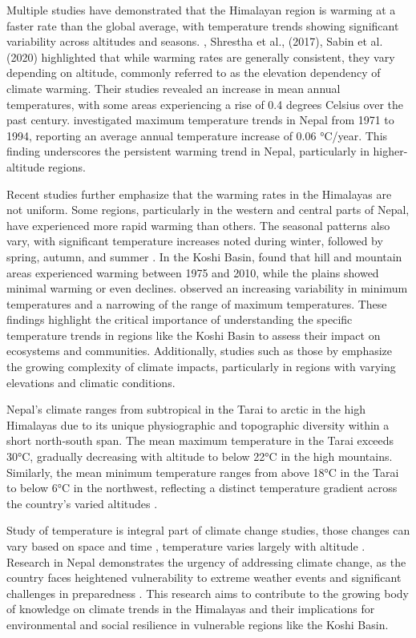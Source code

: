 Multiple studies have demonstrated that the Himalayan region is warming at a faster rate than the global average, with temperature trends showing significant variability across altitudes and seasons. \citet{hingane_longterm_1985,shrestha_observed_2017,Sabin2020} , Shrestha et al., (2017), Sabin et al. (2020) highlighted that while warming rates are generally consistent, they vary depending on altitude, commonly referred to as the elevation dependency of climate warming. Their studies revealed an increase in mean annual temperatures, with some areas experiencing a rise of 0.4 degrees Celsius over the past century. \citet{shrestha_maximum_1999} investigated maximum temperature trends in Nepal from 1971 to 1994, reporting an average annual temperature increase of 0.06 °C/year. This finding underscores the persistent warming trend in Nepal, particularly in higher-altitude regions.


Recent studies further emphasize that the warming rates in the Himalayas are not uniform. Some regions, particularly in the western and central parts of Nepal, have experienced more rapid warming than others. The seasonal patterns also vary, with significant temperature increases noted during winter, followed by spring, autumn, and summer \citep{agarwal_analysis_2016}. In the Koshi Basin, \citet{shrestha_observed_2017}  found that hill and mountain areas experienced warming between 1975 and 2010, while the plains showed minimal warming or even declines. \citet{bastakoti_agriculture_2017} observed an increasing variability in minimum temperatures and a narrowing of the range of maximum temperatures. These findings highlight the critical importance of understanding the specific temperature trends in regions like the Koshi Basin to assess their impact on ecosystems and communities. Additionally, studies such as those by \citet{poudel_spatiotemporal_2020} emphasize the growing complexity of climate impacts, particularly in regions with varying elevations and climatic conditions.


Nepal's climate ranges from subtropical in the Tarai to arctic in the high Himalayas due to its unique physiographic and topographic diversity within a short north-south span. The mean maximum temperature in the Tarai exceeds 30°C, gradually decreasing with altitude to below 22°C in the high mountains. Similarly, the mean minimum temperature ranges from above 18°C in the Tarai to below 6°C in the northwest, reflecting a distinct temperature gradient across the country's varied altitudes \citep{marahatta_temporal_2009}.


Study of temperature is integral part of climate change studies, those changes can vary based on space and time \citep{bajracharya_future_2023}, temperature varies largely with altitude \citep{chand_trend_2019}. Research in Nepal demonstrates the urgency of addressing climate change, as the country faces heightened vulnerability to extreme weather events and significant challenges in preparedness \citep{chapagain_unpacking_2021}. This research aims to contribute to the growing body of knowledge on climate trends in the Himalayas and their implications for environmental and social resilience in vulnerable regions like the Koshi Basin.

